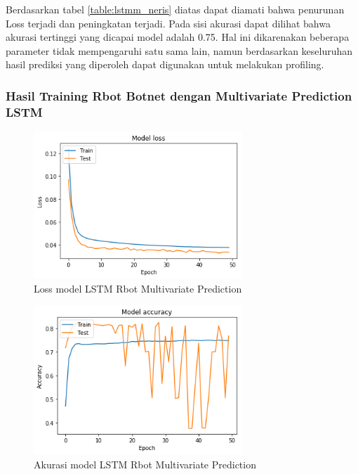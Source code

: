 \documentclass[./skripsi.tex]{subfiles}
\begin{document}
\par Berdasarkan tabel \ref{table:lstmm_neris} diatas dapat diamati bahwa penurunan Loss terjadi dan peningkatan terjadi. Pada sisi akurasi dapat dilihat bahwa akurasi tertinggi yang dicapai model adalah 0.75. Hal ini dikarenakan beberapa parameter tidak mempengaruhi satu sama lain, namun berdasarkan keseluruhan hasil prediksi yang diperoleh dapat digunakan untuk melakukan profiling.

\subsubsection{Hasil Training Rbot Botnet dengan Multivariate Prediction LSTM}

\begin{figure}%
    \centering
    \includegraphics[width=0.7\textwidth]{public/assets/img/lstmm_rbot_loss.png}
    \caption{Loss model LSTM Rbot Multivariate Prediction}
    \label{fig:lstmm_rbot_loss}
\end{figure}

\begin{figure}%
    \centering
    \includegraphics[width=0.7\textwidth]{public/assets/img/lstmm_rbot_acc.png}
    \caption{Akurasi model LSTM Rbot Multivariate Prediction}
    \label{fig:lstmm_rbot_acc}
\end{figure}
\end{document}
